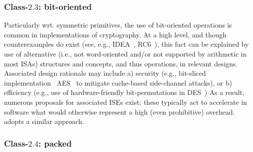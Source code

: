\subsubsection{Class-$2.3$: bit-oriented}
\label{sec:bg:feature:2:3}

Particularly wrt. symmetric primitives, the use of bit-oriented operations 
is common in implementations of cryptography.  At a high level, and though 
counterexamples do exist 
(see, e.g., IDEA~\cite{SCARV:LaiMas:90}, RC6~\cite{SCARV:RRSY:98}),
this fact can be explained by use of alternative (i.e., not word-oriented
and/or not supported by arithmetic in most ISAs) structures and concepts,
and thus operations, in relevant designs.  Associated design rationale may
include
a) security
   (e.g., bit-sliced implementation~\cite{SCARV:KasSch:09} AES~\cite{SCARV:FIPS:197} to mitigate cache-based side-channel attacks),
   or
b) efficiency
   (e.g., use of hardware-friendly bit-permutations in DES~\cite{SCARV:FIPS:46_3})
As a result, numerous proposals for associated ISEs exist; these typically
act to accelerate in software what would otherwise represent a high (even 
prohibitive) overhead.  \XCID adopts a similar approach.


\subsubsection{Class-$2.4$: packed}
\label{sec:bg:feature:2:4}







%
%
%

